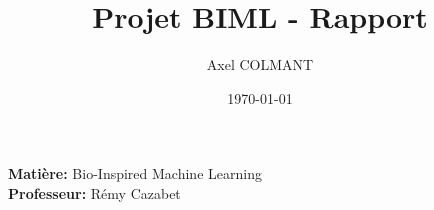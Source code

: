 \documentclass{article}
\title{Projet BIML - Rapport}
\author{Axel COLMANT}
\date{\today}
\newcommand{\matiere}{Bio-Inspired Machine Learning}
\newcommand{\professeur}{Rémy Cazabet}
\begin{document}
\maketitle

\begin{center}
    \textbf{Matière:} \matiere \\
    \textbf{Professeur:} \professeur
\end{center}

\vspace{1cm}

\tableofcontents
\clearpage





\end{document}
